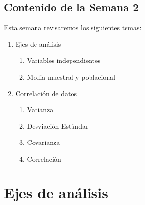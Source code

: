 \documentclass{article}
\begin{document}
\clearpage



\subsection{Contenido de la Semana 2}

Esta semana revisaremos los siguientes temas:

\begin{enumerate}
    \item Ejes de análisis
    \begin{enumerate}
        \item Variables independientes
        \item Media muestral y poblacional
    \end{enumerate}
    \item Correlación de datos
    \begin{enumerate}
        \item Varianza
        \item Desviación Estándar
        \item Covarianza
        \item Correlación
    \end{enumerate}
\end{enumerate}

\section{Ejes de análisis}
\end{document}
